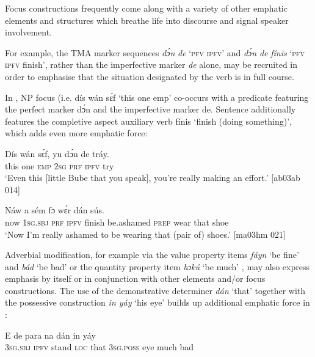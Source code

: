 Focus constructions frequently come along with a variety of other emphatic elements and structures which breathe life into discourse and signal speaker involvement. 


For example, the TMA marker sequences \textit{dɔ́n} \textit{de} ‘\textsc{pfv} \textsc{ipfv}’ and \textit{dɔ́n} \textit{de} \textit{fínis} ‘\textsc{pfv} \textsc{ipfv} finish’, rather than the imperfective marker \textit{de} alone, may be recruited in order to emphasise that the situation designated by the verb is in full course. 



In , NP focus (i.e. dís wán sɛ́f ‘this one emp’ co-occurs with a predicate featuring the perfect marker dɔ́n and the imperfective marker de. Sentence  additionally features the completive aspect{\fff} auxiliary verb fínis ‘finish (doing something)’, which adds even more emphatic force: 



\ea%
    \label{ex:key:742}
    \gll Dís  wán    sɛ́f,  yu  dɔ́n  de  tráy.\\
this  one    \textsc{emp}  \textsc{2sg}  \textsc{prf}  \textsc{ipfv}  try\\

\glt ‘Even this [little Bube that you speak], you’re really making an effort.’ [ab03ab 014]
\z


\ea%
    \label{ex:key:743}
    \gll Náw    a      sém  
fɔ  wɛ́r    dán    sús.\\
now    \textsc{1sg.sbj}  \textsc{prf}  \textsc{ipfv}  finish  be.ashamed
\textsc{prep}  wear  that    shoe\\

\glt ‘Now I’m really ashamed to be wearing that (pair of) shoes.’ [ma03hm 021]
\z

Adverbial modification, for example via the value property items \textit{fáyn} ‘be fine’ and \textit{bád} ‘be bad’ or the quantity property item \textit{bɔkú} ‘be much’ , may also express emphasis by itself or in conjunction with other elements and/or focus constructions. The use of the demonstrative determiner \textit{dán} ‘that’ together with the possessive construction \textit{in yáy} ‘his eye’ builds up additional emphatic force in :


\ea%
    \label{ex:key:744}
    \gll E    de  para    na  dán  in    yáy    \\
\textsc{3sg.sbj}  \textsc{ipfv}  stand  \textsc{loc}  that  \textsc{3sg.poss}  eye  much  bad\\

